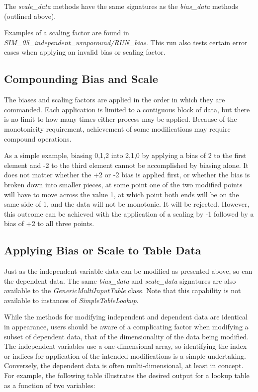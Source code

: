\documentclass[11pt,fleqn]{report}
\begin{document}
The \textit{scale\_data} methods have the same signatures as the
\textit{bias\_data} methods (outlined above).


Examples of a scaling factor are found in
\textit{SIM\_05\_independent\_wraparound/RUN\_bias}.  This run also tests
certain error cases when applying an invalid bias or scaling factor.

\subsection {Compounding Bias and Scale}
The biases and scaling factors are applied in the order in which they are
commanded.  Each application is limited to a contiguous block of data, but
there is no limit to how many times either process may be applied.
Because of the monotonicity requirement, achievement of some modifications may
require compound operations.

As a simple example, biasing {0,1,2} into {2,1,0} by applying a bias of 2
to the first element and -2 to the third element cannot be accomplished
by biasing alone.  It does not matter whether the +2 or -2 bias is applied
first, or whether the bias is broken down into smaller pieces, at some
point one of the two modified points will have to move across the value 1,
at which point both ends will be on the same side of 1, and the data will
not be monotonic.  It will be rejected.  However, this outcome can be
achieved with the application of a scaling by -1 followed by a bias of
+2 to all three points.


\subsection {Applying Bias or Scale to Table Data}
Just as the independent variable data can be modified as presented above,
so can the
dependent data.  The same \textit{bias\_data} and \textit{scale\_data}
signatures are
also available to the \textit{GenericMultiInputTable} class.  Note that
this capability
is not available to instances of \textit{SimpleTableLookup}.


While the methods for modifying independent and dependent data are identical in
appearance, users should be aware of a complicating factor when modifying
a subset of dependent data, that of the dimensionality of the data being
modified.  The independent variables use a one-dimensional array,
so identifying the index or
indices for application of the intended modifications is a simple undertaking.
Conversely, the dependent data is often multi-dimensional, at least in
concept.  For example, the following table illustrates the desired output
for a lookup table as a function of two variables:
\end{document}
